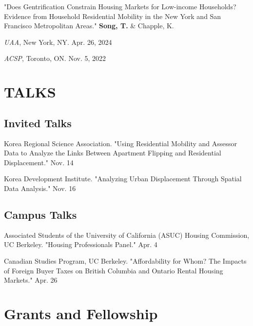 \documentclass[12pt,letterpaper]{report}
\newcommand{\listitemspace}{0.4em}
\renewenvironment{itemize}
{\begin{list}{}{\setlength{\leftmargin}{0.5em}
                \setlength{\parskip}{0em}
                \setlength{\itemsep}{\listitemspace}
                \setlength{\parsep}{\listitemspace}}}
{\end{list}}
\begin{document}
\begin{itemize}
  \item "Does Gentrification Constrain Housing Markets for Low-income Households? Evidence from Household Residential Mobility in the New York and San Francisco Metropolitan Areas." \textbf{Song, T.} \& Chapple, K. 
  \begin{itemize}
      \addtolength{\leftskip}{2em} 
      \setlength{\itemsep}{-0.4em}
      \item[•] \emph{UAA}, New York, NY. Apr. 26, 2024
      \item[•] \emph{ACSP}, Toronto, ON. Nov. 5, 2022
  \end{itemize}
  
\end{itemize}

  \section*{TALKS}
    \subsection*{Invited Talks}
    \begin{tablist}
    \item[2024] \tab{}Korea Regional Science Association. "Using Residential Mobility and Assessor Data to Analyze the Links Between Apartment Flipping and Residential Displacement." Nov. 14
    \item[2022] \tab{}Korea Development Institute. "Analyzing Urban Displacement Through Spatial Data Analysis." Nov. 16
    \end{tablist}
    \subsection*{Campus Talks}
    \begin{tablist}
        \item[2024] \tab{}Associated Students of the University of California (ASUC) Housing Commission, UC Berkeley. "Housing Professionals Panel." Apr. 4
        \item[2023] \tab{}Canadian Studies Program, UC Berkeley. "Affordability for Whom? The Impacts of Foreign Buyer Taxes on British Columbia and Ontario Rental Housing Markets." Apr. 26
    \end{tablist}

\section*{Grants and Fellowship}
\end{document}
